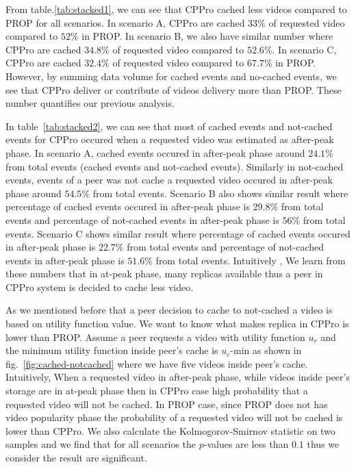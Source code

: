 \documentclass[10pt,final,journal,a4paper]{IEEEtran}
\begin{document}
From table.\ref{tab:stacked1}, we can see that CPPro cached less videos compared to PROP for all scenarios.
In scenario A, CPPro are cached $33\%$ of requested video compared to $52\%$ in PROP.  
In scenario B, we also have similar number where CPPro are cached $34.8\%$ of requested video compared to $52.6\%$. 
In scenario C, CPPro are cached $32.4\%$ of requested video compared to $67.7\%$ in PROP.
However, by summing data volume for cached events and no-cached events, we see that CPPro deliver or contribute of videos delivery more than PROP. 
These number quantifies our previous analysis. 

In table~\ref{tab:stacked2}, we can see that most of cached events and not-cached events for CPPro occured when a requested video was estimated as after-peak phase.
In scenario A, cached events occured in after-peak phase around $24.1\%$ from total events (cached events and not-cached events). 
Similarly in not-cached events, events of a peer was not cache a requested video occured in after-peak phase around $54.5\%$ from total events.
Scenario B also shows similar result where percentage of cached events occured in after-peak phase is $29.8\%$ from total events and percentage of not-cached events in after-peak phase is $56\%$ from total events.
Scenario C shows similar result where percentage of cached events occured in after-peak phase is $22.7\%$ from total events and percentage of not-cached events in after-peak phase is $51.6\%$ from total events.
Intuitively , We learn from these numbers that in at-peak phase, many replicas available thus a peer in CPPro system is decided to cache less video.

As we mentioned before that a peer decision to cache to not-cached a video is based on utility function value.
We want to know what makes replica in CPPro is lower than PROP.
Assume a peer requests a video with utility function $u_r$ and the minimum utility function inside peer's cache is $u_c$-min as shown in fig.~\ref{fig:cached-notcached} where we have five videos inside peer's cache.
Intuitively, When a requested video in after-peak phase, while videos inside peer's storage are in at-peak phase then in CPPro case high probability that a requested video will not be cached.  
In PROP case, since PROP does not has video popularity phase the probability of a requested video will not be cached is lower than CPPro.
We also calculate the Kolmogorov-Smirnov statistic on two samples and we find that for all scenarios the $p$-values are less than $0.1$ thus we consider the result are significant. 
\end{document}
